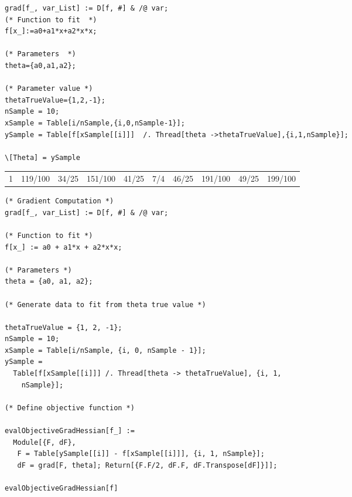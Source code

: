 \documentclass[11pt]{article}
\begin{document}
\begin{verbatim}
grad[f_, var_List] := D[f, #] & /@ var;
(* Function to fit  *)
f[x_]:=a0+a1*x+a2*x*x;

(* Parameters  *)
theta={a0,a1,a2};

(* Parameter value *)
thetaTrueValue={1,2,-1};
nSample = 10;
xSample = Table[i/nSample,{i,0,nSample-1}];
ySample = Table[f[xSample[[i]]]  /. Thread[theta ->thetaTrueValue],{i,1,nSample}];

\[Theta] = ySample
\end{verbatim}

\begin{center}
\begin{tabular}{rlllllllll}
1 & 119/100 & 34/25 & 151/100 & 41/25 & 7/4 & 46/25 & 191/100 & 49/25 & 199/100\\
\end{tabular}
\end{center}


\begin{verbatim}
(* Gradient Computation *)
grad[f_, var_List] := D[f, #] & /@ var;

(* Function to fit *)
f[x_] := a0 + a1*x + a2*x*x;

(* Parameters *)
theta = {a0, a1, a2};

(* Generate data to fit from theta true value *)

thetaTrueValue = {1, 2, -1};
nSample = 10;
xSample = Table[i/nSample, {i, 0, nSample - 1}];
ySample = 
  Table[f[xSample[[i]]] /. Thread[theta -> thetaTrueValue], {i, 1, 
    nSample}];

(* Define objective function *)

evalObjectiveGradHessian[f_] := 
  Module[{F, dF}, 
   F = Table[ySample[[i]] - f[xSample[[i]]], {i, 1, nSample}]; 
   dF = grad[F, theta]; Return[{F.F/2, dF.F, dF.Transpose[dF]}]];

evalObjectiveGradHessian[f]
\end{verbatim}
\end{document}
